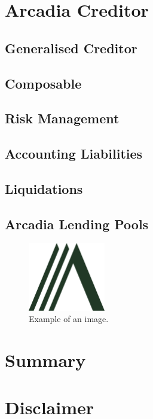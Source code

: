 \documentclass[sigconf,nonacm]{acmart}
\begin{document}
\section{Arcadia Creditor}
\label{sec:arcadia-creditor}

\subsection{Generalised Creditor}

\subsection{Composable}

\subsection{Risk Management}

\subsection{Accounting Liabilities}

\subsection{Liquidations}

\lipsum[5]

\subsection{Arcadia Lending Pools}

\lipsum[6]

\begin{figure}
    \label{fig:arcadia-logo}
    \centering
    \includegraphics[width=0.3\textwidth]{images/Logo-Arcadia.png}
    \caption{Example of an image.}
  \end{figure}

\section{Summary}
\lipsum[7]




\section*{Disclaimer}
\lipsum[8]
\end{document}
